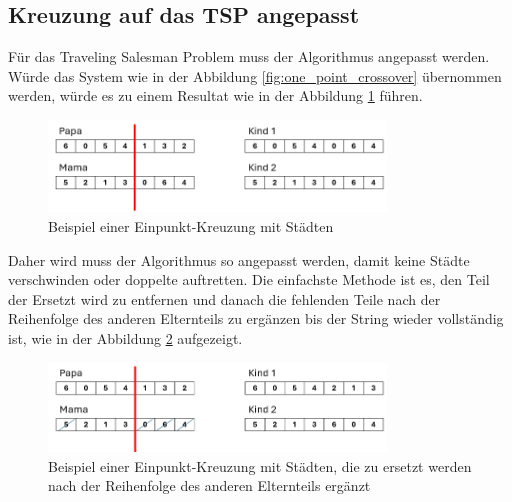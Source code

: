 \subsection{Kreuzung auf das TSP angepasst
\label{buch:paper:varalg:subsection:crossover_tsp}}
Für das Traveling Salesman Problem muss der Algorithmus angepasst werden.
Würde das System wie in der Abbildung \ref{fig:one_point_crossover} 
übernommen werden, würde es zu einem Resultat wie in der Abbildung
\ref{fig:one_point_crossover_cities} führen.
\begin{figure}
	\centering
	\includegraphics[width=0.8\textwidth]{
		papers/varalg/images/teil3/07GeneticStringCitiesCrossoverStandard.png
	}
	\caption{Beispiel einer Einpunkt-Kreuzung mit Städten}
	\label{fig:one_point_crossover_cities}
\end{figure}
Daher wird muss der Algorithmus so angepasst werden, damit keine Städte verschwinden
oder doppelte auftretten. Die einfachste Methode ist es, den Teil der Ersetzt wird
zu entfernen und danach die fehlenden Teile nach der Reihenfolge des anderen
Elternteils zu ergänzen bis der String wieder vollständig ist, wie in der Abbildung
\ref{fig:crossover_order_cities} aufgezeigt.
\begin{figure}
	\centering
	\includegraphics[width=0.8\textwidth]{
		papers/varalg/images/teil3/08GeneticStringCitiesCrossoverSimple.png
	}
	\caption{
		Beispiel einer Einpunkt-Kreuzung mit Städten, die zu ersetzt werden nach
		der Reihenfolge des anderen Elternteils ergänzt
	}
	\label{fig:crossover_order_cities}
\end{figure}
